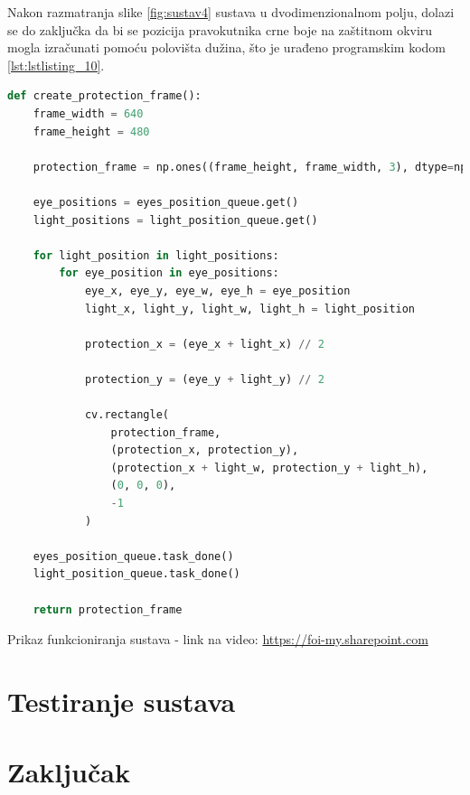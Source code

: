 \documentclass{foi}
\begin{document}
Nakon razmatranja slike \ref{fig:sustav4} sustava u dvodimenzionalnom polju, dolazi se do zaključka da bi se pozicija pravokutnika crne boje na zaštitnom okviru mogla izračunati pomoću polovišta dužina, što je urađeno programskim kodom \ref{lst:lstlisting_10}.
\pagebreak
\begin{lstlisting}[language=Python, label={lst:lstlisting_10}, firstnumber=33, style=colored, caption={Definicija funkcije $create\_protection\_frame()$}]
def create_protection_frame():
    frame_width = 640
    frame_height = 480

    protection_frame = np.ones((frame_height, frame_width, 3), dtype=np.uint8) * 255

    eye_positions = eyes_position_queue.get()
    light_positions = light_position_queue.get()

    for light_position in light_positions:
        for eye_position in eye_positions:
            eye_x, eye_y, eye_w, eye_h = eye_position
            light_x, light_y, light_w, light_h = light_position

            protection_x = (eye_x + light_x) // 2

            protection_y = (eye_y + light_y) // 2

            cv.rectangle(
                protection_frame,
                (protection_x, protection_y),
                (protection_x + light_w, protection_y + light_h),
                (0, 0, 0),
                -1
            )

    eyes_position_queue.task_done()
    light_position_queue.task_done()

    return protection_frame
\end{lstlisting}

Prikaz funkcioniranja sustava - link na video: \href{https://foi-my.sharepoint.com/:v:/g/personal/spetrovic20_foi_hr/ERfsxYop3VFCnwyEWHfwgokB6hWikBInY5lpKwYVjjt91A?nav=eyJyZWZlcnJhbEluZm8iOnsicmVmZXJyYWxBcHAiOiJPbmVEcml2ZUZvckJ1c2luZXNzIiwicmVmZXJyYWxBcHBQbGF0Zm9ybSI6IldlYiIsInJlZmVycmFsTW9kZSI6InZpZXciLCJyZWZlcnJhbFZpZXciOiJNeUZpbGVzTGlua0RpcmVjdCJ9fQ&e=REgtGV}{https://foi-my.sharepoint.com}

\pagebreak
\chapter{Testiranje sustava}

\pagebreak
\chapter{Zaključak}
\end{document}
